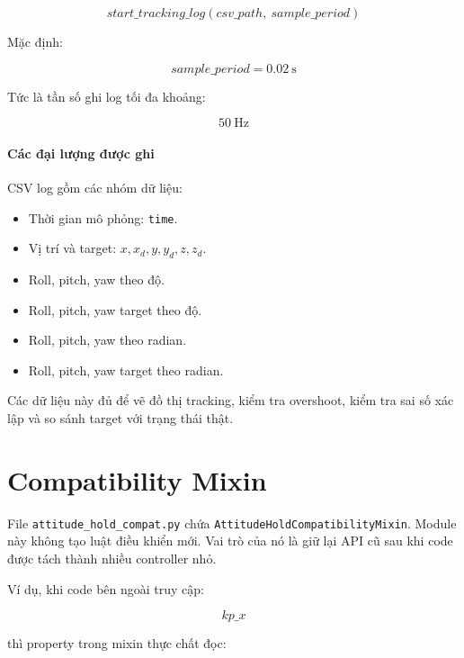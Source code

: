 \begin{equation}
    start\_tracking\_log(csv\_path,\ sample\_period)
\end{equation}

Mặc định:

\begin{equation}
    sample\_period = 0.02\ \mathrm{s}
\end{equation}

Tức là tần số ghi log tối đa khoảng:

\begin{equation}
    50\ \mathrm{Hz}
\end{equation}

\paragraph{Các đại lượng được ghi}

CSV log gồm các nhóm dữ liệu:

\begin{itemize}
    \item Thời gian mô phỏng: \texttt{time}.
    \item Vị trí và target: $x,x_d,y,y_d,z,z_d$.
    \item Roll, pitch, yaw theo độ.
    \item Roll, pitch, yaw target theo độ.
    \item Roll, pitch, yaw theo radian.
    \item Roll, pitch, yaw target theo radian.
\end{itemize}

Các dữ liệu này đủ để vẽ đồ thị tracking, kiểm tra overshoot, kiểm tra sai số
xác lập và so sánh target với trạng thái thật.

\section{Compatibility Mixin}

File \texttt{attitude\_hold\_compat.py} chứa
\texttt{AttitudeHoldCompatibilityMixin}. Module này không tạo luật điều khiển
mới. Vai trò của nó là giữ lại API cũ sau khi code được tách thành nhiều
controller nhỏ.

Ví dụ, khi code bên ngoài truy cập:

\begin{equation}
    kp\_x
\end{equation}

thì property trong mixin thực chất đọc:

